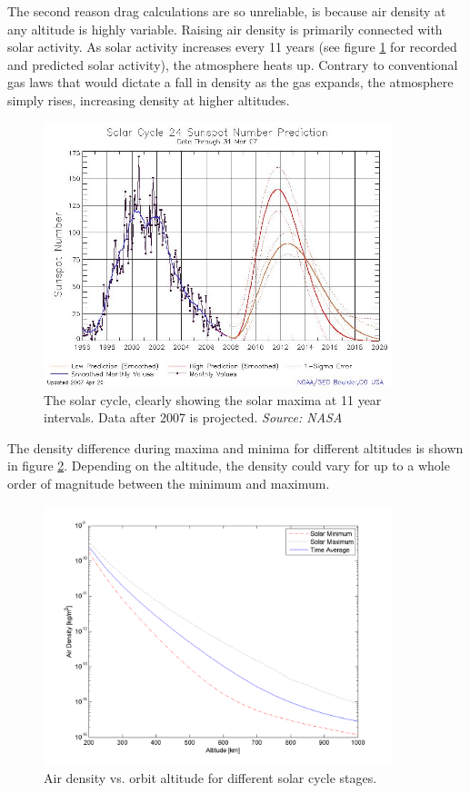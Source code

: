 The second reason drag calculations are so unreliable, is because air density at any altitude is highly variable. Raising air density is primarily connected with solar activity. As solar activity increases every 11 years (see figure \ref{fig:solarCycle} for recorded and predicted solar activity), the atmosphere heats up. Contrary to conventional gas laws that would dictate a fall in density as the gas expands, the atmosphere simply rises, increasing density at higher altitudes.

\begin{figure}[ht!]
\centering
\includegraphics[width=0.9\textwidth, angle=0]{chapters/img/solarCycle.jpg}
\caption{The solar cycle, clearly showing the solar maxima at 11 year intervals. Data after 2007 is projected. \emph{Source: NASA} }
\label{fig:solarCycle}
\end{figure}

The density difference during maxima and minima for different altitudes is shown in figure \ref{fig:densityProfile}. Depending on the altitude, the density could vary for up to a whole order of magnitude between the minimum and maximum.

\begin{figure}[ht!]
\centering
\includegraphics[width=0.9\textwidth, angle=0]{chapters/img/densityAltitude.png}
\caption{Air density vs. orbit altitude for different solar cycle stages.}
\label{fig:densityProfile}
\end{figure}

